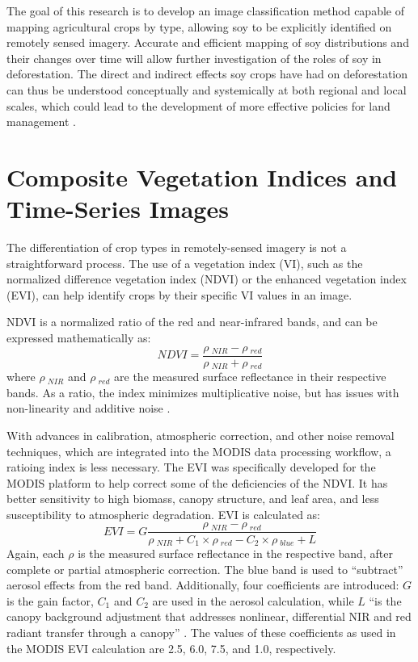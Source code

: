 The goal of this research is to develop an image classification method capable of mapping agricultural crops by type, allowing soy to be explicitly identified on remotely sensed imagery. Accurate and efficient mapping of soy distributions and their changes over time will allow further investigation of the roles of soy in deforestation. The direct and indirect effects soy crops have had on deforestation can thus be understood conceptually and systemically at both regional and local scales, which could lead to the development of more effective policies for land management \autocite{brown2007multitemporal}.


\section{Composite Vegetation Indices and Time-Series Images}

The differentiation of crop types in remotely-sensed imagery is not a straightforward process. The use of a vegetation index (VI), such as the normalized difference vegetation index (NDVI) or the enhanced vegetation index (EVI), can help identify crops by their specific VI values in an image.

NDVI is a normalized ratio of the red and near-infrared bands, and can be expressed mathematically as:
\begin{equation}
  NDVI = \frac{\rho~_{NIR} - \rho~_{red}}{\rho~_{NIR} + \rho~_{red}}
\end{equation}
where $\rho~_{NIR}$ and $\rho~_{red}$ are the measured surface reflectance in their respective bands. As a ratio, the index minimizes multiplicative noise, but has issues with non-linearity and additive noise \autocite{huete2002overview}.

With advances in calibration, atmospheric correction, and other noise removal techniques, which are integrated into the MODIS data processing workflow, a ratioing index is less necessary. The EVI was specifically developed for the MODIS platform to help correct some of the deficiencies of the NDVI. It has better sensitivity to high biomass, canopy structure, and leaf area, and less susceptibility to atmospheric degradation. EVI is calculated as:
\begin{equation}
  EVI = G\frac{\rho~_{NIR} - \rho~_{red}}{\rho~_{NIR} +  C_1\times\rho~_{red} - C_2 \times \rho~_{blue} + L}
\end{equation}
Again, each $\rho$ is the measured surface reflectance in the respective band, after complete or partial atmospheric correction. The blue band is used to ``subtract'' aerosol effects from the red band. Additionally, four coefficients are introduced: $G$ is the gain factor, $C_1$ and $C_2$ are used in the aerosol calculation, while $L$ ``is the canopy background adjustment that addresses nonlinear, differential NIR and red radiant transfer through a canopy'' \citereset\autocite[196]{huete2002overview}. The values of these coefficients as used in the MODIS EVI calculation are 2.5, 6.0, 7.5, and 1.0, respectively.

